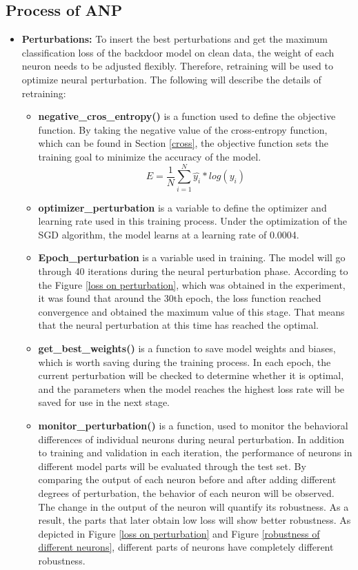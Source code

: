 \documentclass[english,version-2022-01]{uzl-thesis}
\begin{document}
\subsection{Process of ANP}
\begin{itemize}
    \item \textbf{Perturbations:} To insert the best perturbations and get the maximum classification loss of the backdoor model on clean data, the weight of each neuron needs to be adjusted flexibly. Therefore, retraining will be used to optimize neural perturbation. The following will describe the details of retraining:
    \begin{itemize}
        \item \textbf{negative\_cros\_entropy()} is a function used to define the objective function. By taking the negative value of the cross-entropy function, which can be found in Section \ref{cross}, the objective function sets the training goal to minimize the accuracy of the model. 
         $$E=\frac{1}{N}\sum_{i=1}^{N}\widehat{y_{i}}*log(y_{i})$$
        \item \textbf{optimizer\_perturbation} is a variable to define the optimizer and learning rate used in this training process. Under the optimization of the SGD algorithm, the model learns at a learning rate of 0.0004.\\
        \item \textbf{Epoch\_perturbation} is a variable used in training. The model will go through 40 iterations during the neural perturbation phase. According to the Figure \ref{loss on perturbation}, which was obtained in the experiment, it was found that around the 30th epoch, the loss function reached convergence and obtained the maximum value of this stage. That means that the neural perturbation at this time has reached the optimal.\\
        \item \textbf{get\_best\_weights()} is a function to save model weights and biases, which is worth saving during the training process. In each epoch, the current perturbation will be checked to determine whether it is optimal, and the parameters when the model reaches the highest loss rate will be saved for use in the next stage.\\
        \item \textbf{monitor\_perturbation()} is a function, used to monitor the behavioral differences of individual neurons during neural perturbation. In addition to training and validation in each iteration, the performance of neurons in different model parts will be evaluated through the test set. By comparing the output of each neuron before and after adding different degrees of perturbation, the behavior of each neuron will be observed. The change in the output of the neuron will quantify its robustness. As a result, the parts that later obtain low loss will show better robustness. As depicted in Figure \ref{loss on perturbation} and Figure \ref{robustness of different neurons}, different parts of neurons have completely different robustness.

\end{itemize}
\end{itemize}
\end{document}
